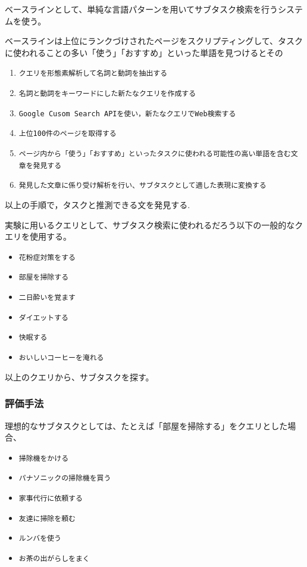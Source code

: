 \documentclass[submit,techreq]{ipsj}
\def\|{\verb|}
\begin{document}
ベースラインとして、単純な言語パターンを用いてサブタスク検索を行うシステムを使う。

ベースラインは上位にランクづけされたページをスクリプティングして、タスクに使われることの多い「使う」「おすすめ」といった単語を見つけるとその

\begin{enumerate}
\item \|クエリを形態素解析して名詞と動詞を抽出する|
\item \|名詞と動詞をキーワードにした新たなクエリを作成する|
\item \|Google Cusom Search APIを使い，新たなクエリでWeb検索する|
\item \|上位100件のページを取得する|
\item \|ページ内から「使う」「おすすめ」といったタスクに使われる可能性の高い単語を含む文章を発見する|
\item \|発見した文章に係り受け解析を行い、サブタスクとして適した表現に変換する|

\end{enumerate}

以上の手順で，タスクと推測できる文を発見する.

実験に用いるクエリとして、サブタスク検索に使われるだろう以下の一般的なクエリを使用する。

\begin{itemize}
\item \|花粉症対策をする|
\item \|部屋を掃除する|
\item \|二日酔いを覚ます|
\item \|ダイエットする|
\item \|快眠する|
\item \|おいしいコーヒーを淹れる|
\end{itemize}


以上のクエリから、サブタスクを探す。


\subsubsection{評価手法}

理想的なサブタスクとしては、たとえば「部屋を掃除する」をクエリとした場合、

\begin{itemize}
\item \|掃除機をかける|
\item \|パナソニックの掃除機を買う|
\item \|家事代行に依頼する|
\item \|友達に掃除を頼む|
\item \|ルンバを使う|
\item \|お茶の出がらしをまく|
\end{itemize}
\end{document}
